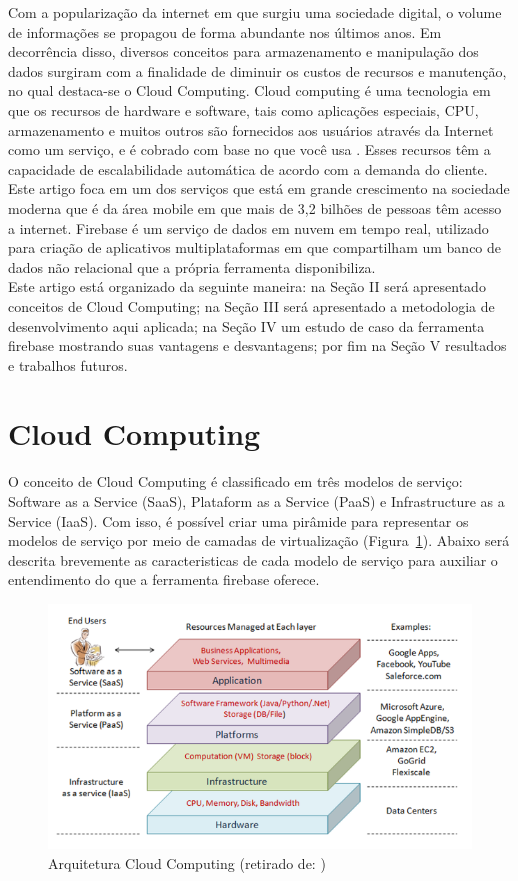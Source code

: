 \documentclass[12pt]{article}
\begin{document}
Com a popularização da internet em que surgiu uma sociedade digital, o volume de informações se propagou de forma abundante nos últimos anos. Em decorrência disso, diversos conceitos para armazenamento e manipulação dos dados surgiram com a finalidade de diminuir os custos de recursos e manutenção, no qual destaca-se o Cloud Computing. Cloud computing é uma tecnologia em que os recursos de hardware e software, tais como aplicações especiais, CPU, armazenamento e muitos outros são fornecidos aos usuários através da Internet como um serviço, e é cobrado com base no que você usa \cite{1}. Esses recursos têm a capacidade de escalabilidade automática de acordo com a demanda do cliente.
\\
Este artigo foca em um dos serviços que está em grande crescimento na sociedade moderna que é da área mobile em que mais de 3,2 bilhões de pessoas têm acesso a internet. Firebase é um serviço de dados em nuvem em tempo real, utilizado para criação de aplicativos multiplataformas em que compartilham um banco de dados não relacional que a própria ferramenta disponibiliza. 
\\
Este artigo está organizado da seguinte maneira: na Seção II será apresentado conceitos de Cloud Computing; na Seção III será apresentado a metodologia de desenvolvimento aqui aplicada; na Seção IV um estudo de caso da ferramenta firebase mostrando suas vantagens e desvantagens; por fim na Seção V resultados e trabalhos futuros.

\section{Cloud Computing} \label{sec:firstpage}

O conceito de Cloud Computing é classificado em três modelos de serviço: Software as a Service (SaaS), Plataform as a Service (PaaS) e Infrastructure as a Service (IaaS). Com isso, é possível criar uma pirâmide para representar os modelos de serviço por meio de camadas de virtualização (Figura~\ref{fig:architeture}). Abaixo será descrita brevemente as caracteristicas de cada modelo de serviço para auxiliar o entendimento do que a ferramenta firebase oferece.

\begin{figure}[ht]
\centering
\includegraphics[width=.9\textwidth]{architeture.png}
\caption{Arquitetura Cloud Computing (retirado de: \cite{2})}
\label{fig:architeture}
\end{figure}
\end{document}
